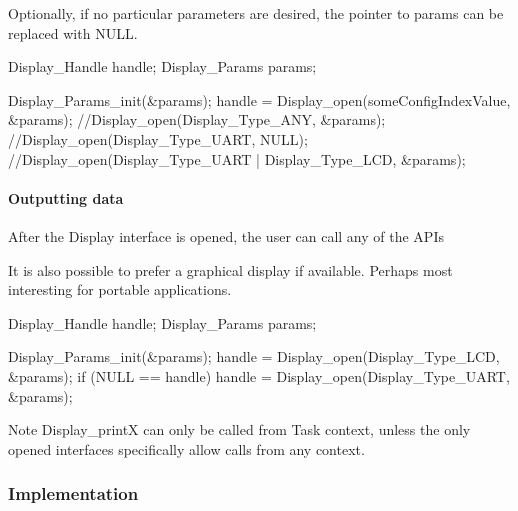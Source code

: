 Optionally, if no particular parameters are desired, the pointer to params can be replaced with N\+U\+L\+L.


\begin{DoxyCode}
Display_Handle    handle;
Display_Params    params;

Display_Params_init(&params);
handle = Display_open(someConfigIndexValue, &params);
\textcolor{comment}{//Display\_open(Display\_Type\_ANY, &params);}
\textcolor{comment}{//Display\_open(Display\_Type\_UART, NULL);}
\textcolor{comment}{//Display\_open(Display\_Type\_UART | Display\_Type\_LCD, &params);}
\end{DoxyCode}


\paragraph*{Outputting data}

After the Display interface is opened, the user can call any of the A\+P\+Is 


It is also possible to prefer a graphical display if available. Perhaps most interesting for portable applications.


\begin{DoxyCode}
Display_Handle    handle;
Display_Params    params;

Display_Params_init(&params);
handle = Display_open(Display_Type_LCD, &params);
\textcolor{keywordflow}{if} (NULL == handle)
   handle = Display_open(Display_Type_UART, &params);
\end{DoxyCode}


\begin{DoxyNote}{Note}
Display\+\_\+print\+X can only be called from Task context, unless the only opened interfaces specifically allow calls from any context.
\end{DoxyNote}
\subsubsection*{Implementation}

